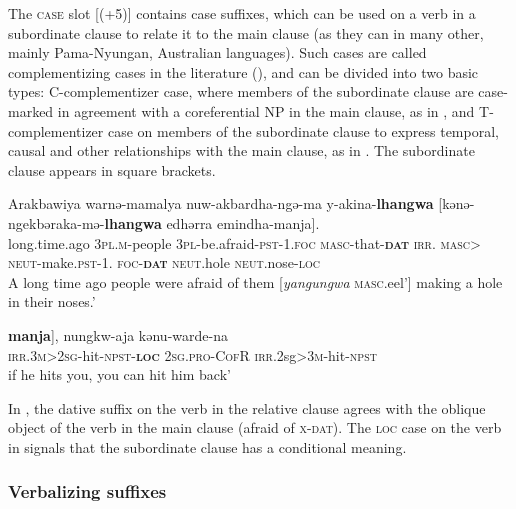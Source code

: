 \documentclass[output=paper]{langscibook}
\begin{document}
The \textsc{case} slot [(+5)] contains case suffixes, which can be used on a verb in a subordinate clause to relate it to the main clause (as they can in many other, mainly Pama-Nyungan, Australian languages). Such cases are called complementizing cases in the literature (\citealt{DenchEvans1988}), and can be divided into two basic types: C-complementizer case, where members of the subordinate clause are case-marked in agreement with a coreferential NP in the main clause, as in , and T-complementizer case on members of the subordinate clause to express temporal, causal and other relationships with the main clause, as in . The subordinate clause appears in square brackets.



\ea%
 \label{ex:vanegmond:7}

 \ea
 \label{ex:vanegmond:7a}
\gll Arakbawiya warnə-mamalya nuw-akbardha-ngə-ma y-akina-\textbf{{lhangwa}} [kənə-ngekbəraka-mə-\textbf{lhangwa} edhərra emindha-manja].\\
 long.time.ago \textsc{3pl.m}-people \textsc{3pl}-be.afraid-\textsc{pst}-1.\textsc{foc} \textsc{masc}-that-\textbf{\textsc{dat}} \textsc{irr}. \textsc{masc}> \textsc{neut}-make.\textsc{pst}-1. \textsc{foc}-\textbf{\textsc{dat}} \textsc{neut}.hole \textsc{neut}.nose-\textsc{loc}\\
\glt A long time ago people were afraid of them [\textit{yangungwa} \textsc{masc}.eel’] making a hole in their noses.’



\ex
\label{ex:vanegmond:7b}
\gll {[kenu-warde-na-}\textbf{{manja}}], nungkw-aja kənu-warde-na\\
 \textsc{irr}.\textsc{3m>2sg-}hit-\textsc{npst}-\textbf{\textsc{loc}} \textsc{2sg.pro}-\textsc{CofR} \textsc{irr}.2sg>\textsc{3m}-hit-\textsc{npst}\\
\glt if he hits you, you can hit him back’
\z
\z



In , the dative suffix on the verb in the relative clause agrees with the oblique object of the verb in the main clause (afraid of \textsc{x}-\textsc{dat}). The \textsc{loc} case on the verb in  signals that the subordinate clause has a conditional meaning.



\subsubsection{Verbalizing suffixes}\label{sec:vanegmond:2.3.2}
\end{document}
